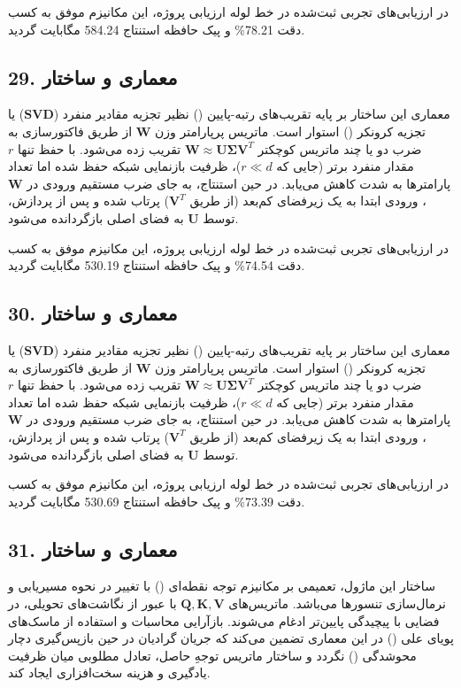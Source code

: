 \documentclass[12pt,a4paper]{report}
\theoremstyle{definition}
\begin{document}
در ارزیابی‌های تجربی ثبت‌شده در خط لوله ارزیابی پروژه، این مکانیزم موفق به کسب دقت 78.21\% و پیک حافظه استنتاج 584.24 مگابایت گردید.

\subsection*{29. معماری و ساختار }
معماری این ساختار بر پایه تقریب‌های رتبه-پایین () نظیر تجزیه مقادیر منفرد ($\mathbf{SVD}$) یا تجزیه کرونکر () استوار است. ماتریس پرپارامتر وزن $\mathbf{W}$ از طریق فاکتورسازی به ضرب دو یا چند ماتریس کوچکتر $\mathbf{W} \approx \mathbf{U} \mathbf{\Sigma} \mathbf{V}^T$ تقریب زده می‌شود. با حفظ تنها $r$ مقدار منفرد برتر (جایی که $r \ll d$)، ظرفیت بازنمایی شبکه حفظ شده اما تعداد پارامترها به شدت کاهش می‌یابد. در حین استنتاج، به جای ضرب مستقیم ورودی در $\mathbf{W}$، ورودی ابتدا به یک زیرفضای کم‌بعد (از طریق $\mathbf{V}^T$) پرتاب شده و پس از پردازش، توسط $\mathbf{U}$ به فضای اصلی بازگردانده می‌شود.

در ارزیابی‌های تجربی ثبت‌شده در خط لوله ارزیابی پروژه، این مکانیزم موفق به کسب دقت 74.54\% و پیک حافظه استنتاج 530.19 مگابایت گردید.

\subsection*{30. معماری و ساختار }
معماری این ساختار بر پایه تقریب‌های رتبه-پایین () نظیر تجزیه مقادیر منفرد ($\mathbf{SVD}$) یا تجزیه کرونکر () استوار است. ماتریس پرپارامتر وزن $\mathbf{W}$ از طریق فاکتورسازی به ضرب دو یا چند ماتریس کوچکتر $\mathbf{W} \approx \mathbf{U} \mathbf{\Sigma} \mathbf{V}^T$ تقریب زده می‌شود. با حفظ تنها $r$ مقدار منفرد برتر (جایی که $r \ll d$)، ظرفیت بازنمایی شبکه حفظ شده اما تعداد پارامترها به شدت کاهش می‌یابد. در حین استنتاج، به جای ضرب مستقیم ورودی در $\mathbf{W}$، ورودی ابتدا به یک زیرفضای کم‌بعد (از طریق $\mathbf{V}^T$) پرتاب شده و پس از پردازش، توسط $\mathbf{U}$ به فضای اصلی بازگردانده می‌شود.

در ارزیابی‌های تجربی ثبت‌شده در خط لوله ارزیابی پروژه، این مکانیزم موفق به کسب دقت 73.39\% و پیک حافظه استنتاج 530.69 مگابایت گردید.

\subsection*{31. معماری و ساختار }
ساختار این ماژول، تعمیمی بر مکانیزم توجه نقطه‌ای () با تغییر در نحوه مسیریابی و نرمال‌سازی تنسورها می‌باشد. ماتریس‌های $\mathbf{Q, K, V}$ با عبور از نگاشت‌های تحویلی، در فضایی با پیچیدگی پایین‌تر ادغام می‌شوند. بازآرایی محاسبات و استفاده از ماسک‌های پویای علی () در این معماری تضمین می‌کند که جریان گرادیان در حین بازپس‌گیری دچار محوشدگی () نگردد و ساختار ماتریس توجهِ حاصل، تعادل مطلوبی میان ظرفیت یادگیری و هزینه سخت‌افزاری ایجاد کند.
\end{document}
